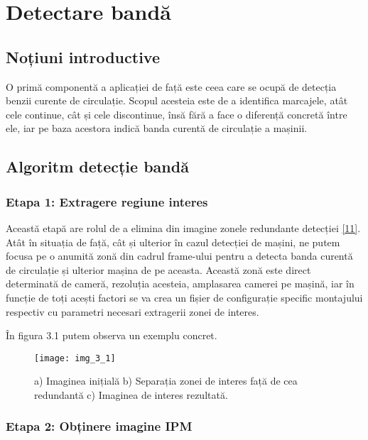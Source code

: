 \section{Detectare bandă}
\subsection*{Noțiuni introductive}
O primă componentă a aplicației de față este ceea care se ocupă de detecția benzii curente de circulație. Scopul acesteia este de a identifica marcajele, atât cele continue, cât și cele discontinue, însă fără a face o diferență concretă între ele, iar pe baza acestora indică banda curentă de circulație a mașinii.

\subsection*{Algoritm detecție bandă}
\subsubsection*{Etapa 1: Extragere regiune interes}

Această etapă are rolul de a elimina din imagine zonele redundante detecției \hyperlink{WaymoSystem}{[11]}. Atât în situația de față, cât și ulterior în cazul detecției de mașini, ne putem focusa pe o anumită zonă din cadrul frame-ului pentru a detecta banda curentă de circulație și ulterior mașina de pe aceasta. 
Această zonă este direct determinată de cameră, rezoluția acesteia, amplasarea camerei pe mașină, iar în funcție de toți acești factori se va crea un fișier de configurație specific montajului respectiv cu parametri necesari extragerii zonei de interes.

În figura 3.1 putem observa un exemplu concret.
\begin{figure}[!h]
	\centering
	\texttt{[image: img\_3\_1]}
	\caption[Zonă interes imagine]{a) Imaginea inițială b) Separația zonei de interes față de cea redundantă c) Imaginea de interes rezultată.}
\end{figure}

\subsubsection*{Etapa 2: Obținere imagine IPM}

